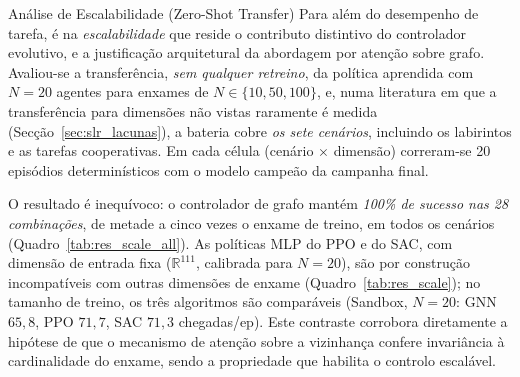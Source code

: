 \documentclass[12pt,reqno, twoside]{amsbook}
\makeatletter
\def\section{\@startsection{section}{1}%
      \z@{.5\linespacing\@plus.7\linespacing}{.25\linespacing}%
      {\normalfont\bfseries\flushleft}}
\theoremstyle{plain}
\numberwithin{equation}{chapter}
\numberwithin{section}{chapter}
\numberwithin{table}{chapter}
\numberwithin{figure}{chapter}
\makeatother
\begin{document}


\section{Análise de Escalabilidade (Zero-Shot Transfer)}
\label{sec:res_scale}
Para além do desempenho de tarefa, é na \emph{escalabilidade} que reside o contributo distintivo do controlador evolutivo, e a justificação arquitetural da abordagem por atenção sobre grafo. Avaliou-se a transferência, \emph{sem qualquer retreino}, da política aprendida com $N=20$ agentes para enxames de $N \in \{10, 50, 100\}$, e, numa literatura em que a transferência para dimensões não vistas raramente é medida (Secção~\ref{sec:slr_lacunas}), a bateria cobre \emph{os sete cenários}, incluindo os labirintos e as tarefas cooperativas. Em cada célula (cenário $\times$ dimensão) correram-se 20 episódios determinísticos com o modelo campeão da campanha final.

O resultado é inequívoco: o controlador de grafo mantém \emph{100\% de sucesso nas 28 combinações}, de metade a cinco vezes o enxame de treino, em todos os cenários (Quadro~\ref{tab:res_scale_all}). As políticas MLP do PPO e do SAC, com dimensão de entrada fixa ($\mathbb{R}^{111}$, calibrada para $N=20$), são por construção incompatíveis com outras dimensões de enxame (Quadro~\ref{tab:res_scale}); no tamanho de treino, os três algoritmos são comparáveis (Sandbox, $N=20$: GNN $65{,}8$, PPO $71{,}7$, SAC $71{,}3$ chegadas/ep). Este contraste corrobora diretamente a hipótese de que o mecanismo de atenção sobre a vizinhança confere invariância à cardinalidade do enxame, sendo a propriedade que habilita o controlo escalável.
\end{document}
